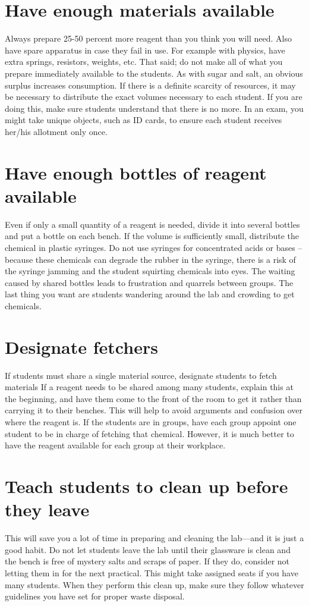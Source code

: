 \section{Have enough materials available}
Always prepare 25-50 percent more reagent 
than you think you will need. 
Also have spare apparatus in case they fail in use. 
For example with physics, 
have extra springs, 
resistors, 
weights, 
etc. 
That said; do not make all of what you prepare 
immediately available to the students. 
As with sugar and salt, 
an obvious surplus increases consumption. 
If there is a definite scarcity of resources, 
it may be necessary to distribute the exact volumes necessary 
to each student. 
If you are doing this, 
make sure students understand that there is no more. 
In an exam, 
you might take unique objects, 
such as ID cards, 
to ensure each student receives her/his allotment only once.

\section{Have enough bottles of reagent available}
Even if only a small quantity of a reagent is needed, 
divide it into several bottles and put a bottle on each bench. 
If the volume is sufficiently small, 
distribute the chemical in plastic syringes. 
Do not use syringes for concentrated acids or bases – 
because these chemicals can degrade the rubber in the syringe, 
there is a risk of the syringe jamming 
and the student squirting chemicals into eyes. 
The waiting caused by shared bottles leads 
to frustration and quarrels between groups. 
The last thing you want are students wandering around the lab 
and crowding to get chemicals. 

\section{Designate fetchers}
If students must share a single material source, 
designate students to fetch materials
If a reagent needs to be shared among many students, 
explain this at the beginning, 
and have them come to the front of the room to get it 
rather than carrying it to their benches. 
This will help to avoid arguments 
and confusion over where the reagent is. 
If the students are in groups, 
have each group appoint one student 
to be in charge of fetching that chemical. 
However, 
it is much better to have the reagent available 
for each group at their workplace.

\section{Teach students to clean up before they leave}
This will save you a lot of time in preparing 
and cleaning the lab—and it is just a good habit. 
Do not let students leave the lab until their glassware is 
clean and the bench is free of mystery salts and scraps of paper. 
If they do, 
consider not letting them in for the next practical. 
This might take assigned seats if you have many students. 
When they perform this clean up, 
make sure they follow whatever guidelines 
you have set for proper waste disposal.

